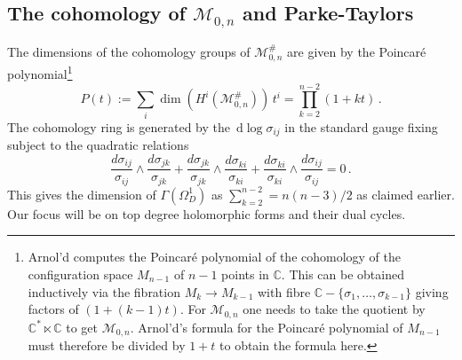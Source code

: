 \documentclass[11pt]{article}
\newcommand{\C}{\mathbb{C}}
\newcommand{\cM}{\mathcal{M}}
\newcommand{\rd}{\, \mathrm{d}}
\newcommand{\1}{{\rm 1\hskip-0.25em I}}
\begin{document}
\subsection{The cohomology of $\cM_{0,n}$ and Parke-Taylors} 

The dimensions of the cohomology groups of $\cM_{0,n}^\#$
are given by  the Poincar\'e polynomial\footnote{Arnol'd \cite{Arnold}
computes the Poincar\'e polynomial of the cohomology of the configuration space $M_{n-1}$ of $n-1$ points in $\C$.  This can be obtained inductively via  the fibration $M_{k}\rightarrow M_{k-1}$ with fibre $\C-\{\sigma_1,\ldots,\sigma_{k-1}\}$ giving factors of $(1+(k-1)t)$. For $\cM_{0,n}$ one needs to take the quotient by $\C^*\ltimes \C$ to get $\cM_{0,n}$.   Arnol'd's formula for the Poincar\'e polynomial of $M_{n-1}$  must therefore be divided  by $1+t$ to obtain the formula here.}  
\begin{equation}
P(t) :=\sum_i \dim (H^i(\cM^\#_{0,n}))\,t^i=\prod_{k=2}^{n-2} (1+kt)\, .
\end{equation}
The cohomology ring is generated by the $\rd \log \sigma_{ij}$ in the standard gauge fixing subject to the quadratic relations 
\begin{equation}
\frac{d\sigma_{ij}}{\sigma_{ij}} \wedge \frac{d \sigma_{jk}}{\sigma_{jk}} +
\frac{d\sigma_{jk}}{\sigma_{jk}} \wedge \frac{d\sigma_{ki}}{\sigma_{ki}} +
\frac{d\sigma_{ki}}{\sigma_{ki}} \wedge \frac{d\sigma_{ij}}{\sigma_{ij}} =0\, . \label{schouten}
\end{equation}
This gives the dimension of $\Gamma(\Omega_D^1)$ as $\sum_{k=2}^{n-2}=n(n-3)/2$ as claimed earlier. Our focus will be on  top degree holomorphic forms and their dual cycles.  
\end{document}
